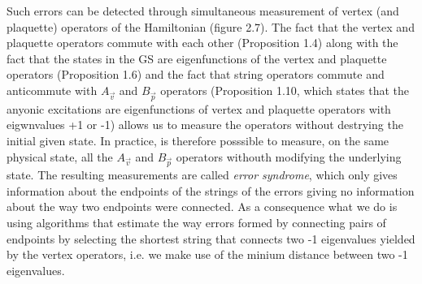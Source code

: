 \documentclass{Configuration_Files/PoliMi3i_thesis}
\begin{document}
Such errors can be detected through  simultaneous measurement of vertex (and plaquette) operators of the Hamiltonian (figure 2.7). The fact that the vertex and plaquette operators commute with each other (Proposition 1.4) along with the fact that the states in the GS are eigenfunctions of the vertex and plaquette operators (Proposition 1.6) and the fact that string operators commute and anticommute with $A_{\vec{v}}$ and $B_{\vec{p}}$ operators (Proposition 1.10, which states that the anyonic excitations are eigenfunctions of vertex and plaquette operators with eigwnvalues +1 or -1) allows us to measure the operators without destrying the initial given state. In practice, is therefore posssible to measure, on the same physical state, all the $A_{\vec{v}}$ and $B_{\vec{p}}$ operators withouth modifying the underlying state. The resulting measurements are called {\it error syndrome}, which only gives information about the endpoints of the strings of the errors giving no information about the way two endpoints were connected. As a consequence what we do is using algorithms that estimate the way errors formed by connecting pairs of endpoints by selecting the shortest string that connects two -1 eigenvalues yielded by the vertex operators, i.e. we make use of the minium distance between two -1 eigenvalues. \newline
\end{document}
